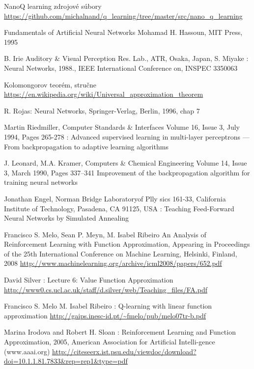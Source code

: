 \begin{thebibliography}{99}
NanoQ learning zdrojové súbory \url{https://github.com/michalnand/q_learning/tree/master/src/nano_q_learning}

Fundamentals of Artificial Neural Networks Mohamad H. Hassoun, MIT Press, 1995

B. Irie Auditory \& Visual Perception Res. Lab., ATR, Osaka, Japan, S. Miyake :
Neural Networks, 1988., IEEE International Conference on, INSPEC 3350063

Kolomongorov teorém, stručne
\url{https://en.wikipedia.org/wiki/Universal_approximation_theorem}

R. Rojas: Neural Networks, Springer-Verlag, Berlin, 1996, chap 7

Martin Riedmiller,  Computer Standards \& Interfaces Volume 16, Issue 3, July 1994, Pages 265-278 :
Advanced supervised learning in multi-layer perceptrons — From backpropagation to adaptive learning algorithms

J. Leonard, M.A. Kramer, Computers \& Chemical Engineering Volume 14, Issue 3, March 1990, Pages 337–341
Improvement of the backpropagation algorithm for training neural networks

 Jonathan Engel,
Norman Bridge Laboratoryof Plly sics 161-33, California Institute of Technology,
Pasadena, CA 91125, USA : Teaching Feed-Forward Neural Networks by Simulated Annealing



 Francisco S. Melo, Sean P. Meyn, M. Isabel Ribeiro
An Analysis of Reinforcement Learning with Function Approximation,
Appearing in Proceedings of the 25th International Conference on Machine Learning, Helsinki, Finland, 2008
\url{http://www.machinelearning.org/archive/icml2008/papers/652.pdf}

 David Silver : Lecture 6: Value Function Approximation
\url{http://www0.cs.ucl.ac.uk/staff/d.silver/web/Teaching_files/FA.pdf}

 Francisco S. Melo M. Isabel Ribeiro : Q-learning with linear function approximation
\url{http://gaips.inesc-id.pt/~fmelo/pub/melo07tr-b.pdf}

 Marina Irodova and Robert H. Sloan : Reinforcement Learning and Function Approximation,
2005,  American  Association  for  Artificial  Intelli-gence (www.aaai.org)
\url{http://citeseerx.ist.psu.edu/viewdoc/download?doi=10.1.1.81.7833&rep=rep1&type=pdf}




\end{thebibliography}
